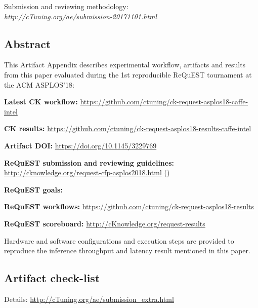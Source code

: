 \documentclass[sigplan]{acmart}
\newenvironment{packed_itemize}{
\begin{itemize}
  \setlength{\itemsep}{1pt}
  \setlength{\parskip}{0pt}
  \setlength{\parsep}{0pt}
}{\end{itemize}}
\begin{document}
Submission and reviewing methodology: \\
{\em http://cTuning.org/ae/submission-20171101.html}

\subsection{Abstract}

This Artifact Appendix describes experimental workflow,
artifacts and results from this paper evaluated 
during the 1st reproducible ReQuEST tournament at the ACM ASPLOS'18:

\begin{packed_itemize}
  \item {\bf Latest CK workflow:} \url{https://github.com/ctuning/ck-request-asplos18-caffe-intel}
  \item {\bf CK results:} \url{https://github.com/ctuning/ck-request-asplos18-results-caffe-intel}
  \item {\bf Artifact DOI:} \url{https://doi.org/10.1145/3229769}
  \item {\bf ReQuEST submission and reviewing guidelines:} \url{http://cknowledge.org/request-cfp-asplos2018.html} (\cite{request-asplos18})
  \item {\bf ReQuEST goals:} \cite{cm:29db2248aba45e59:0c7348dfbadd5b95}
  \item {\bf ReQuEST workflows:} \url{https://github.com/ctuning/ck-request-asplos18-results}
  \item {\bf ReQuEST scoreboard:} \url{http://cKnowledge.org/request-results}
\end{packed_itemize}

Hardware and software configurations and execution steps are
provided to reproduce the inference throughput and latency
result mentioned in this paper.

\subsection{Artifact check-list}

Details: \url{http://cTuning.org/ae/submission_extra.html}
\end{document}

